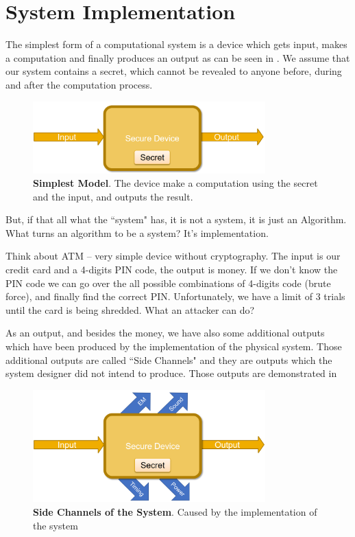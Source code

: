 \section{System Implementation} \label{sec:SystemImpl}

The simplest form of a computational system is a device which gets input, makes
a computation and finally produces an output as can be seen in
. We assume that our system contains a secret, which cannot be
revealed to anyone before, during and after the computation process. 

\begin{figure}[!ht]
    \centering
    \includegraphics[width=0.8\textwidth]{images/ch1_Intro/Secure_device1.png}
    \caption{\textbf{Simplest Model}. The device make a computation using the secret and the input, and outputs the result.} \label{fig:SecDev1}
\end{figure}

But, if that all what the ``system" has, it is not a system, it is just an
Algorithm. What turns an algorithm to be a system? It's implementation.

Think about ATM – very simple device without cryptography. The input is our
credit card and a 4-digits PIN code, the output is money. If we don't know the
PIN code we can go over the all possible combinations of 4-digits code (brute
force), and finally find the correct PIN. Unfortunately, we have a limit of 3
trials until the card is being shredded. What an attacker can do?

As an output, and besides the money, we have also some additional outputs which
have been produced by the implementation of the physical system. Those
additional outputs are called ``Side Channels" and they are outputs which the
system designer did not intend to produce. Those outputs are demonstrated in

\begin{figure}[!ht]
    \centering
    \includegraphics[width=0.8\textwidth]{images/ch1_Intro/Secure_device2.png}
    \caption{\textbf{Side Channels of the System}. Caused by the implementation of the system}
    \label{fig:SecDev2}
\end{figure}

